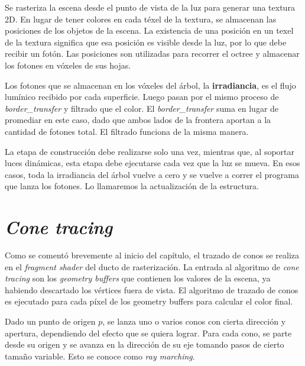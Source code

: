 Se rasteriza la escena desde el punto de vista de la luz para generar una textura 2D.
En lugar de tener colores en cada téxel de la textura, se almacenan las posiciones de los objetos de la escena.
La existencia de una posición en un texel de la textura significa que esa posición es visible desde la luz, por lo que debe recibir un fotón.
Las posiciones son utilizadas para recorrer el octree y almacenar los fotones en vóxeles de sus hojas.

Los fotones que se almacenan en los vóxeles del árbol, la \textbf{irradiancia}, es el flujo lumínico recibido por cada superficie.
Luego pasan por el mismo proceso de \textit{border\_transfer} y filtrado que el color.
El \textit{border\_transfer} suma en lugar de promediar en este caso, dado que ambos lados de la frontera aportan a la cantidad de fotones total.
El filtrado funciona de la misma manera.

La etapa de construcción debe realizarse solo una vez, mientras que, al soportar luces dinámicas, esta etapa debe ejecutarse cada vez que la luz se mueva.
En esos casos, toda la irradiancia del árbol vuelve a cero y se vuelve a correr el programa que lanza los fotones.
Lo llamaremos la actualización de la estructura.


\section{\textit{Cone tracing}}\label{sec:cone_tracing}

Como se comentó brevemente al inicio del capítulo, el trazado de conos se realiza en el \textit{fragment shader} del ducto de rasterización.
La entrada al algoritmo de \textit{cone tracing} son los \textit{geometry buffers} que contienen los valores de la escena, ya habiendo descartado los vértices fuera de vista.
El algoritmo de trazado de conos es ejecutado para cada píxel de los geometry buffers para calcular el color final.

Dado un punto de origen $p$, se lanza uno o varios conos con cierta dirección y apertura, dependiendo del efecto que se quiera lograr.
Para cada cono, se parte desde su origen y se avanza en la dirección de su eje tomando pasos de cierto tamaño variable.
Esto se conoce como \textit{ray marching}. %


